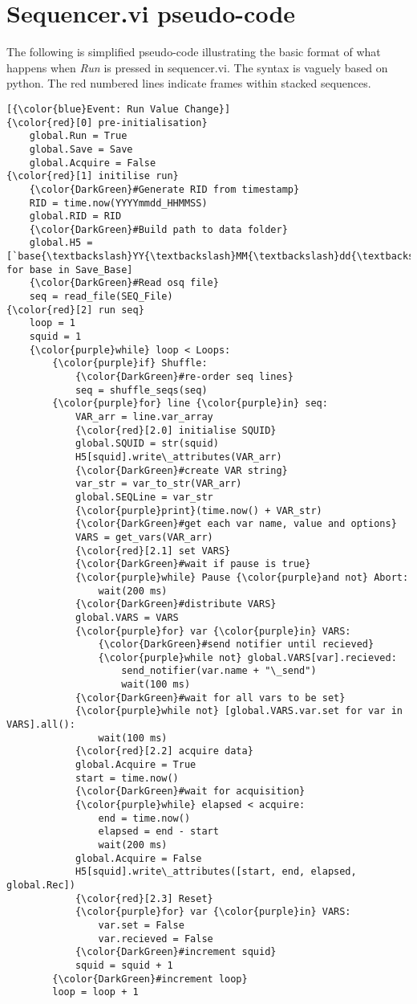 \documentclass[10pt,a4paper]{article}
\begin{document}
\section{\label{sex:pseudo}Sequencer.vi pseudo-code}
The following is simplified pseudo-code illustrating the basic format of what happens when \emph{Run} is pressed in sequencer.vi.  The syntax is vaguely based on python.  The red numbered lines indicate frames within stacked sequences.
\begin{Verbatim}[commandchars=\\\{\}]
[{\color{blue}Event: Run Value Change}]
{\color{red}[0] pre-initialisation}
	global.Run = True
	global.Save = Save
	global.Acquire = False
{\color{red}[1] initilise run}
	{\color{DarkGreen}#Generate RID from timestamp}
	RID = time.now(YYYYmmdd_HHMMSS) 
	global.RID = RID
	{\color{DarkGreen}#Build path to data folder} 
	global.H5 = [`base{\textbackslash}YY{\textbackslash}MM{\textbackslash}dd{\textbackslash}RID' for base in Save_Base]
	{\color{DarkGreen}#Read osq file}
	seq = read_file(SEQ_File)
{\color{red}[2] run seq}
	loop = 1
	squid = 1
	{\color{purple}while} loop < Loops:
		{\color{purple}if} Shuffle:
			{\color{DarkGreen}#re-order seq lines}	
			seq = shuffle_seqs(seq)
		{\color{purple}for} line {\color{purple}in} seq:
			VAR_arr = line.var_array
			{\color{red}[2.0] initialise SQUID}
			global.SQUID = str(squid)
			H5[squid].write\_attributes(VAR_arr)
			{\color{DarkGreen}#create VAR string}
			var_str = var_to_str(VAR_arr)
			global.SEQLine = var_str
			{\color{purple}print}(time.now() + VAR_str)
			{\color{DarkGreen}#get each var name, value and options}	
			VARS = get_vars(VAR_arr)
			{\color{red}[2.1] set VARS}
			{\color{DarkGreen}#wait if pause is true}
			{\color{purple}while} Pause {\color{purple}and not} Abort:
				wait(200 ms)
			{\color{DarkGreen}#distribute VARS}
			global.VARS = VARS
			{\color{purple}for} var {\color{purple}in} VARS:
				{\color{DarkGreen}#send notifier until recieved}
				{\color{purple}while not} global.VARS[var].recieved:
					send_notifier(var.name + "\_send")
					wait(100 ms)
			{\color{DarkGreen}#wait for all vars to be set}
			{\color{purple}while not} [global.VARS.var.set for var in VARS].all():
				wait(100 ms)
			{\color{red}[2.2] acquire data}
			global.Acquire = True
			start = time.now()
			{\color{DarkGreen}#wait for acquisition}
			{\color{purple}while} elapsed < acquire:
				end = time.now()
				elapsed = end - start
				wait(200 ms)
			global.Acquire = False
			H5[squid].write\_attributes([start, end, elapsed, global.Rec])
			{\color{red}[2.3] Reset}
			{\color{purple}for} var {\color{purple}in} VARS:
				var.set = False
				var.recieved = False
			{\color{DarkGreen}#increment squid}
			squid = squid + 1
		{\color{DarkGreen}#increment loop}
		loop = loop + 1

\end{Verbatim}
\end{document}

